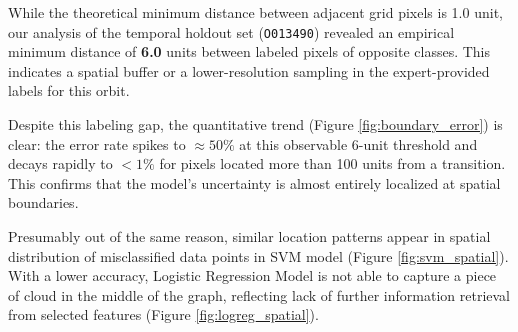 While the theoretical minimum distance between adjacent grid pixels is 1.0 unit, our analysis of the temporal holdout set (\texttt{O013490}) revealed an empirical minimum distance of \textbf{6.0} units between labeled pixels of opposite classes. This indicates a spatial buffer or a lower-resolution sampling in the expert-provided labels for this orbit.

Despite this labeling gap, the quantitative trend (Figure \ref{fig:boundary_error}) is clear: the error rate spikes to $\approx 50\%$ at this observable 6-unit threshold and decays rapidly to $<1\%$ for pixels located more than 100 units from a transition. This confirms that the model's uncertainty is almost entirely localized at spatial boundaries.


Presumably out of the same reason, similar location patterns appear in spatial distribution of misclassified data points in SVM model (Figure \ref{fig:svm_spatial}). With a lower accuracy, Logistic Regression Model is not able to capture a piece of cloud in the middle of the graph, reflecting lack of further information retrieval from selected features (Figure \ref{fig:logreg_spatial}).


